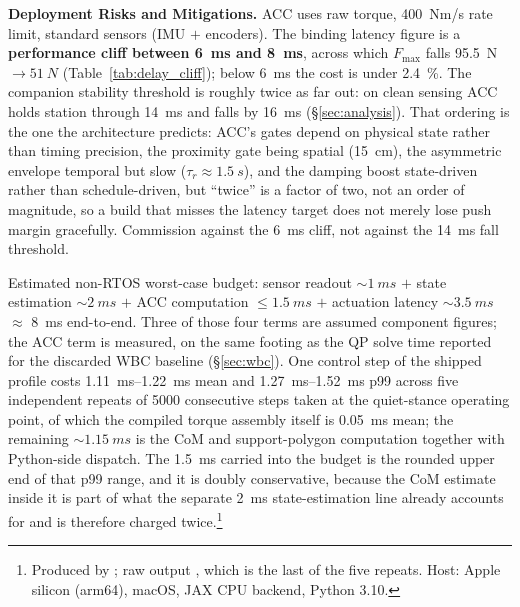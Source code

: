 \documentclass[conference]{IEEEtran}
\begin{document}
\textbf{Deployment Risks and Mitigations.}
ACC uses raw torque, \SI{400}{Nm/s} rate limit, standard sensors (IMU $+$ encoders). The binding latency figure is a \textbf{performance cliff between \SI{6}{ms} and \SI{8}{ms}}, across which $F_{\max}$ falls \SI{95.5}{N}${\rightarrow}\SI{51}{N}$ (Table~\ref{tab:delay_cliff}); below \SI{6}{ms} the cost is under \SI{2.4}{\percent}. The companion stability threshold is roughly twice as far out: on clean sensing ACC holds station through \SI{14}{ms} and falls by \SI{16}{ms} (\S\ref{sec:analysis}). That ordering is the one the architecture predicts: ACC's gates depend on physical state rather than timing precision, the proximity gate being spatial (\SI{15}{cm}), the asymmetric envelope temporal but slow ($\tau_r{\approx}\SI{1.5}{s}$), and the damping boost state-driven rather than schedule-driven, but ``twice'' is a factor of two, not an order of magnitude, so a build that misses the latency target does not merely lose push margin gracefully. Commission against the \SI{6}{ms} cliff, not against the \SI{14}{ms} fall threshold.

Estimated non-RTOS worst-case budget: sensor readout ${\sim}\SI{1}{ms}$ $+$ state estimation ${\sim}\SI{2}{ms}$ $+$ ACC computation ${\le}\SI{1.5}{ms}$ $+$ actuation latency ${\sim}\SI{3.5}{ms}$ $\approx$ \SI{8}{ms} end-to-end. Three of those four terms are assumed component figures; the ACC term is measured, on the same footing as the QP solve time reported for the discarded WBC baseline (\S\ref{sec:wbc}). One control step of the shipped profile costs \SIrange{1.11}{1.22}{ms} mean and \SIrange{1.27}{1.52}{ms} p99 across five independent repeats of \num{5000} consecutive steps taken at the quiet-stance operating point, of which the compiled torque assembly itself is \SI{0.05}{ms} mean; the remaining ${\sim}\SI{1.15}{ms}$ is the CoM and support-polygon computation together with Python-side dispatch. The \SI{1.5}{ms} carried into the budget is the rounded upper end of that p99 range, and it is doubly conservative, because the CoM estimate inside it is part of what the separate \SI{2}{ms} state-estimation line already accounts for and is therefore charged twice.\footnote{Produced by ; raw output , which is the last of the five repeats. Host: Apple silicon (arm64), macOS, JAX CPU backend, Python 3.10.}
\end{document}
